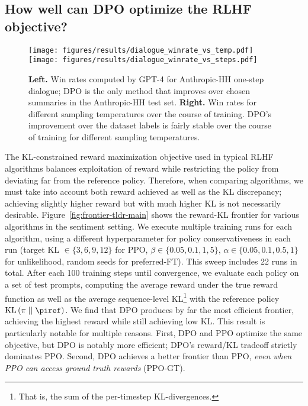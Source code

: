 \subsection{How well can DPO optimize the RLHF objective?}

\begin{figure}
    \centering
    \texttt{[image: figures/results/dialogue\_winrate\_vs\_temp.pdf]}
    \texttt{[image: figures/results/dialogue\_winrate\_vs\_steps.pdf]}
    \caption{\textbf{Left.} Win rates computed by GPT-4 for Anthropic-HH one-step dialogue; DPO is the only method that improves over chosen summaries in the Anthropic-HH test set. \textbf{Right.} Win rates for different sampling temperatures over the course of training. DPO's improvement over the dataset labels is fairly stable over the course of training for different sampling temperatures.}
    \vspace{-2mm}
    \label{fig:dialogue-main}
\end{figure}

The KL-constrained reward maximization objective used in typical RLHF algorithms balances exploitation of reward while restricting the policy from deviating far from the reference policy. Therefore, when comparing algorithms, we must take into account both reward achieved as well as the KL discrepancy; achieving slightly higher reward but with much higher KL is not necessarily desirable. Figure~\ref{fig:frontier-tldr-main} shows the reward-KL frontier for various algorithms in the sentiment setting. We execute multiple training runs for each algorithm, using a different hyperparameter for policy conservativeness in each run (target KL $\in\{3,6,9,12\}$ for PPO, $\beta \in \{0.05,0.1,1,5\}$, $\alpha\in\{0.05,0.1,0.5,1\}$ for unlikelihood, random seeds for preferred-FT). This sweep includes 22 runs in total. After each 100 training steps until convergence, we evaluate each policy on a set of test prompts, computing the average reward under the true reward function as well as the average sequence-level KL\footnote{That is, the sum of the per-timestep KL-divergences.} with the reference policy $\text{KL}\left(\pi\mid \mid \piref\right)$. We find that DPO produces by far the most efficient frontier, achieving the highest reward while still achieving low KL. This result is particularly notable for multiple reasons. First, DPO and PPO optimize the same objective, but DPO is notably more efficient; DPO's reward/KL tradeoff strictly dominates PPO. Second, DPO achieves a better frontier than PPO, \emph{even when PPO can access ground truth rewards} (PPO-GT).

